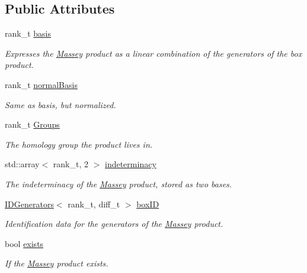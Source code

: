 \subsection*{Public Attributes}
\begin{DoxyCompactItemize}
\item 
rank\+\_\+t \hyperlink{classMackey_1_1Massey_ab738306412d735a31df4913c20948d65}{basis}
\begin{DoxyCompactList}\small\item\em Expresses the \hyperlink{classMackey_1_1Massey}{Massey} product as a linear combination of the generators of the box product. \end{DoxyCompactList}\item 
rank\+\_\+t \hyperlink{classMackey_1_1Massey_a36e3aa9de7d7617feb243d886c5936c8}{normal\+Basis}
\begin{DoxyCompactList}\small\item\em Same as basis, but normalized. \end{DoxyCompactList}\item 
rank\+\_\+t \hyperlink{classMackey_1_1Massey_a221c49aa23c7d7cb9a3d26db9e6e4a94}{Groups}
\begin{DoxyCompactList}\small\item\em The homology group the product lives in. \end{DoxyCompactList}\item 
std\+::array$<$ rank\+\_\+t, 2 $>$ \hyperlink{classMackey_1_1Massey_a16f62ab5c5d3960702ae9804a3cbdb1f}{indeterminacy}
\begin{DoxyCompactList}\small\item\em The indeterminacy of the \hyperlink{classMackey_1_1Massey}{Massey} product, stored as two bases. \end{DoxyCompactList}\item 
\hyperlink{classMackey_1_1IDGenerators}{I\+D\+Generators}$<$ rank\+\_\+t, diff\+\_\+t $>$ \hyperlink{classMackey_1_1Massey_ad24cfa697a806bc4468aa12154868447}{box\+ID}
\begin{DoxyCompactList}\small\item\em Identification data for the generators of the \hyperlink{classMackey_1_1Massey}{Massey} product. \end{DoxyCompactList}\item 
bool \hyperlink{classMackey_1_1Massey_a7890eb54ac6d6c48576ba131a59e551f}{exists}
\begin{DoxyCompactList}\small\item\em If the \hyperlink{classMackey_1_1Massey}{Massey} product exists. \end{DoxyCompactList}\item 

\end{DoxyCompactItemize}
